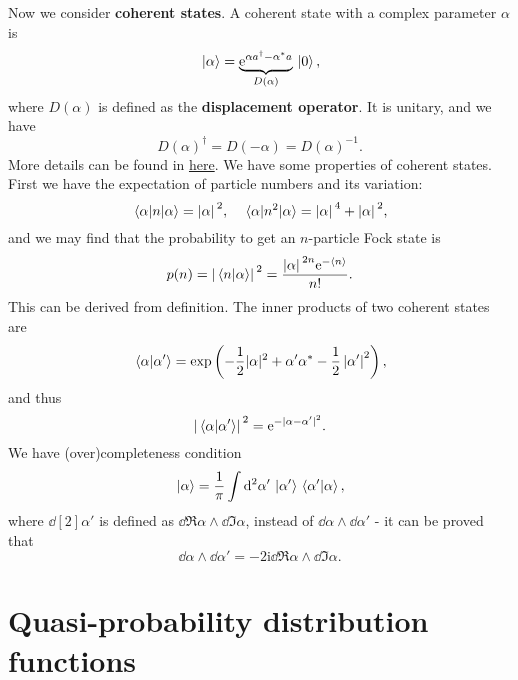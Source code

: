 \documentclass[hyperref, a4paper]{article}
\newcommand*{\ii}{\mathrm{i}}
\newcommand*{\ee}{\mathrm{e}}
\newcommand*{\concept}[1]{{\textbf{#1}}}
\begin{document}
Now we consider \concept{coherent states}. A coherent state with a complex parameter $\alpha$ is 
\begin{equation}
    \ket*{\alpha} = \underbrace{\ee^{\alpha a^\dagger - \alpha^* a}}_{D(\alpha)} \ket*{0},
\end{equation}
where $D(\alpha)$ is defined as the \concept{displacement operator}.
It is unitary, and we have 
\begin{equation}
    D(\alpha)^\dagger = D(- \alpha) = D(\alpha)^{-1}.
\end{equation}
More details can be found in \href{../quantum-optics-homework/1/1-discussion}{here}.
We have some properties of coherent states. First we have the expectation of particle numbers and its variation:
\begin{equation}
    \expval*{n}{\alpha} = \abs*{\alpha}^2, \quad \expval*{n^2}{\alpha} = \abs*{\alpha}^4 + \abs*{\alpha}^2,
\end{equation}
and we may find that the probability to get an $n$-particle Fock state is 
\begin{equation}
    p(n) = \abs*{\braket*{n}{\alpha}}^2 = \frac{\abs*{\alpha}^{2n} \ee^{- \expval*{n}}}{n!}.
\end{equation}
This can be derived from definition. The inner products of two coherent states are 
\begin{equation}
    \braket*{\alpha}{\alpha'} =\exp \left(-\frac{1}{2}|\alpha|^{2}+\alpha^{\prime} \alpha^{*}-\frac{1}{2}\left|\alpha^{\prime}\right|^{2}\right),
\end{equation}
and thus 
\begin{equation}
    \abs*{\braket*{\alpha}{\alpha'}}^2 = \ee^{- \abs*{\alpha - \alpha'}^2}.
\end{equation} 
We have (over)completeness condition
\begin{equation}
    \ket*{\alpha} = \frac{1}{\pi} \int \dd[2]{\alpha'} \ket*{\alpha'} \braket*{\alpha'}{\alpha},
\end{equation}
where $\dd[2]{\alpha'}$ is defined as $\dd{\Re \alpha} \wedge \dd{\Im \alpha}$, instead of $\dd{\alpha} \wedge \dd{\alpha'}$ - it 
can be proved that 
\begin{equation}
    \dd{\alpha} \wedge \dd{\alpha'} = - 2 \ii \dd{\Re \alpha} \wedge \dd{\Im \alpha}.
\end{equation}

\section{Quasi-probability distribution functions}
\end{document}

